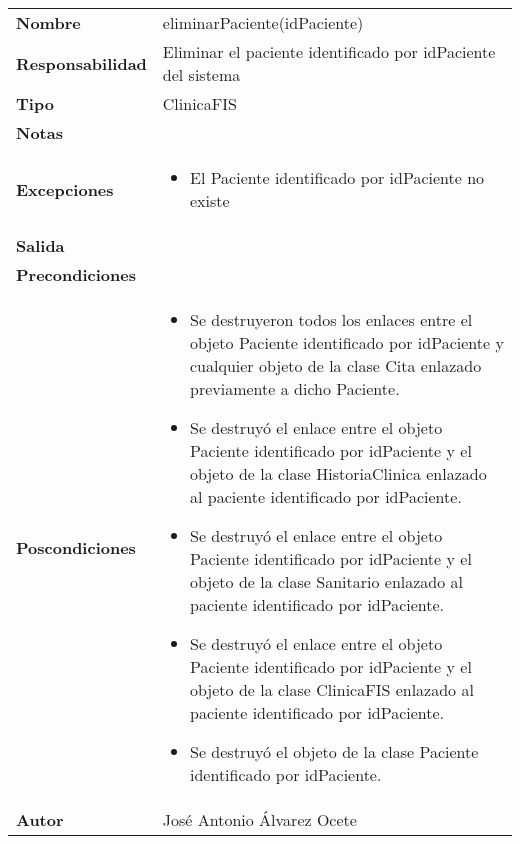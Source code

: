 \documentclass[11pt,a4paper]{article}
\newenvironment{itemizenomargins}
    {\begin{minipage}[t]{1\linewidth}\begin{itemize}}
    {\end{itemize}\end{minipage}}
\begin{document}
\begin{table}[H]
	\centering
	\label{my-label}
	\begin{tabularx}{\textwidth}{l|X}
		\textbf{Nombre}          & eliminarPaciente(idPaciente) \\
		\textbf{Responsabilidad} & Eliminar el paciente identificado por idPaciente del sistema \\
		\textbf{Tipo}            & ClinicaFIS \\
		\textbf{Notas}           &  \\
		\textbf{Excepciones}     & 
		\begin{itemizenomargins}
			\item El Paciente identificado por idPaciente no existe
		\end{itemizenomargins}\\
		\textbf{Salida}          &  \\
		\textbf{Precondiciones}  &  \\
		\textbf{Poscondiciones}  & \begin{itemizenomargins}
			\item Se destruyeron todos los enlaces entre el objeto Paciente identificado por idPaciente y cualquier objeto de la clase Cita enlazado previamente a dicho Paciente.
			\item Se destruyó el enlace entre el objeto Paciente identificado por idPaciente y el objeto de la clase HistoriaClinica enlazado al paciente identificado por idPaciente.
			\item Se destruyó el enlace entre el objeto Paciente identificado por idPaciente y el objeto de la clase Sanitario enlazado al paciente identificado por idPaciente.
			\item Se destruyó el enlace entre el objeto Paciente identificado por idPaciente y el objeto de la clase ClinicaFIS enlazado al paciente identificado por idPaciente.
			\item Se destruyó el objeto de la clase Paciente identificado por idPaciente.
		\end{itemizenomargins}\\
		\textbf{Autor}           & José Antonio Álvarez Ocete
	\end{tabularx}
\end{table}
\end{document}
